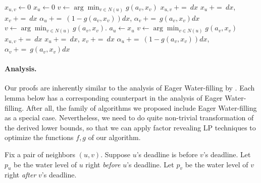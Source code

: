 \begin{algorithm}
	\caption{History-based Pricing Algorithm for Fully Online Matching}
	\label{alg:fully}
	\begin{algorithmic}
		 
		\State $x_{u,v} \gets 0$ 
		\EndFor
		\State $x_{u} \gets 0$ 
		\State $v \gets \arg\min_{v\in N(u)}g(a_v,x_{v})$
			\State $x_{u,v}  ~{\scriptstyle  \mathrel{+}=}~ dx$ 
			\State $x_{u} ~{\scriptstyle  \mathrel{+}=}~ dx$, $x_{v}  ~{\scriptstyle  \mathrel{+}=}~ dx$ 
			\State $\alpha_u   ~{\scriptstyle  \mathrel{+}=}~ (1 - g(a_{v},x_{v}))dx$,  $\alpha_{v}  ~{\scriptstyle  \mathrel{+}=}~ g(a_{v},x_{v})dx$ 
			\State $v \gets \arg\min_{v\in N(u)}g(a_v,x_{v})$.
		\EndWhile
		\State $a_u \gets x_u$ 
	\EndIf
			\State $v \gets \arg\min_{v\in N(u)}g(a_v,x_{v})$ 
			\State $x_{u,v}  ~{\scriptstyle  \mathrel{+}=}~ dx$ 
			\State $x_{u} ~{\scriptstyle  \mathrel{+}=}~ dx$, $x_{v}  ~{\scriptstyle  \mathrel{+}=}~ dx$ 
			\State $\alpha_u   ~{\scriptstyle  \mathrel{+}=}~ (1 - g(a_{v},x_{v}))dx$,  $\alpha_{v}  ~{\scriptstyle  \mathrel{+}=}~ g(a_{v},x_{v})dx$ 
		\EndWhile
	\EndIf
	\end{algorithmic}
\end{algorithm}

\paragraph{Analysis.} 
Our proofs are inherently similar to the analysis of Eager Water-filling by \cite{focs/HuangTWZ20}. Each lemma below has a corresponding counterpart in the analysis of Eager Water-filling. After all, the family of algorithms we proposed include Eager Water-filling as a special case. Nevertheless, we need to do quite non-trivial transformation of the derived lower bounds, so that we can apply factor revealing LP techniques to optimize the functions $f,g$ of our algorithm. 

Fix a pair of neighbors $(u,v)$. Suppose $u$'s deadline is before $v$'s deadline. Let $p_u$ be the water level of $u$ right \emph{before} $u$'s deadline. 
Let $p_v$ be the water level of $v$ right \emph{after} $v$'s deadline. 

